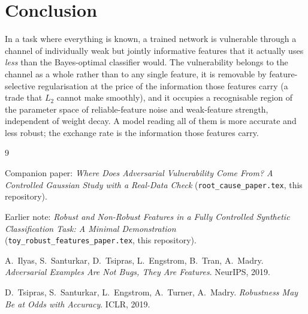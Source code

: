 \documentclass[11pt]{article}
\begin{document}
\section{Conclusion}

In a task where everything is known, a trained network is vulnerable through a channel of individually
weak but jointly informative features that it actually uses \emph{less} than the Bayes-optimal
classifier would. The vulnerability belongs to the channel as a whole rather than to any single
feature, it is removable by feature-selective regularisation at the price of the information those
features carry (a trade that $L_2$ cannot make smoothly), and it occupies a recognisable region of the parameter space of reliable-feature noise and weak-feature
strength, independent of weight decay. A model reading all of them is more accurate and less robust; the exchange rate is the information those features carry.

\begin{thebibliography}{9}

Companion paper: \emph{Where Does Adversarial Vulnerability Come From? A Controlled Gaussian
Study with a Real-Data Check} (\texttt{root\_cause\_paper.tex}, this repository).

Earlier note: \emph{Robust and Non-Robust Features in a Fully Controlled Synthetic Classification
Task: A Minimal Demonstration} (\texttt{toy\_robust\_features\_paper.tex}, this repository).

A.~Ilyas, S.~Santurkar, D.~Tsipras, L.~Engstrom, B.~Tran, A.~Madry.
\emph{Adversarial Examples Are Not Bugs, They Are Features}. NeurIPS, 2019.

D.~Tsipras, S.~Santurkar, L.~Engstrom, A.~Turner, A.~Madry.
\emph{Robustness May Be at Odds with Accuracy}. ICLR, 2019.

\end{thebibliography}
\end{document}
